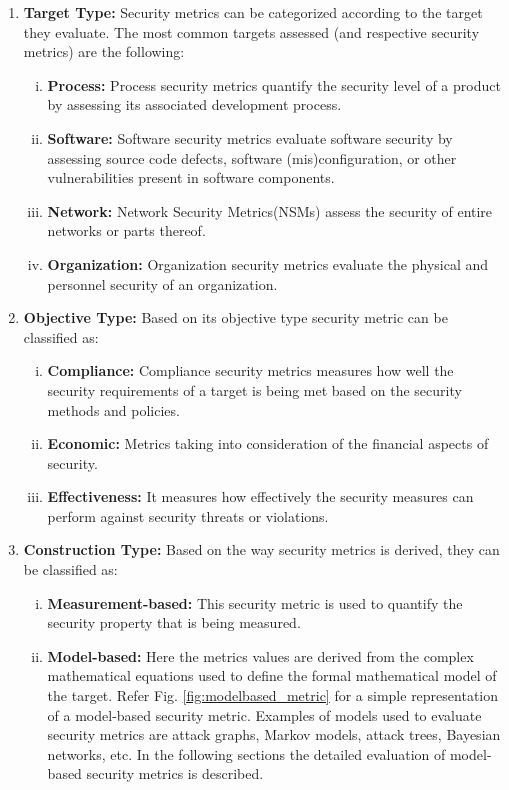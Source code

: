 \documentclass[pdftex,english,oribibl]{llncs}
\begin{document}
\begin{enumerate}[(1)]
	\item {\textbf{Target Type:} Security metrics can be categorized according to the target they evaluate. The most common targets assessed (and respective security metrics) are the following:}
	\begin{enumerate}[(i)]
		\item {\textbf{Process:} Process security metrics quantify the security level of a product by assessing its associated development process.}
		\item {\textbf{Software:} Software security metrics evaluate software security by assessing source code defects, software (mis)configuration, or other vulnerabilities present in software components.}
		\item {\textbf{Network:} Network Security Metrics(NSMs) assess the security of entire networks or parts thereof.}
		\item {\textbf{Organization:} Organization security metrics evaluate the physical and personnel security of an organization.}
	\end{enumerate}

	\item {\textbf{Objective Type:} Based on its objective type security metric can be classified as:}
	\begin{enumerate}[(i)]
	\item {\textbf{Compliance:} Compliance security metrics measures how well the security requirements of a target is being met based on the security methods and policies.}
	\item {\textbf{Economic:} Metrics taking into consideration of the financial aspects of security.}
	\item {\textbf{Effectiveness:} It measures how effectively the security measures can perform against security threats or violations.}
	\end{enumerate}

	\item {\textbf{Construction Type:} Based on the way security metrics is derived, they can be classified as:}
	\begin{enumerate}[(i)]
	\item {\textbf{Measurement-based:} This security metric is used to quantify the security property that is being measured.}
	\item {\textbf{Model-based:} Here the metrics values are derived from the complex mathematical equations used to define the formal mathematical model of the target. Refer Fig. \ref{fig:modelbased_metric} for a simple representation of a model-based security metric. Examples of models used to evaluate security metrics are attack graphs, Markov models, attack trees, Bayesian networks, etc. In the following sections the detailed evaluation of model-based security metrics is described.}


\end{enumerate}
\end{enumerate}
\end{document}
